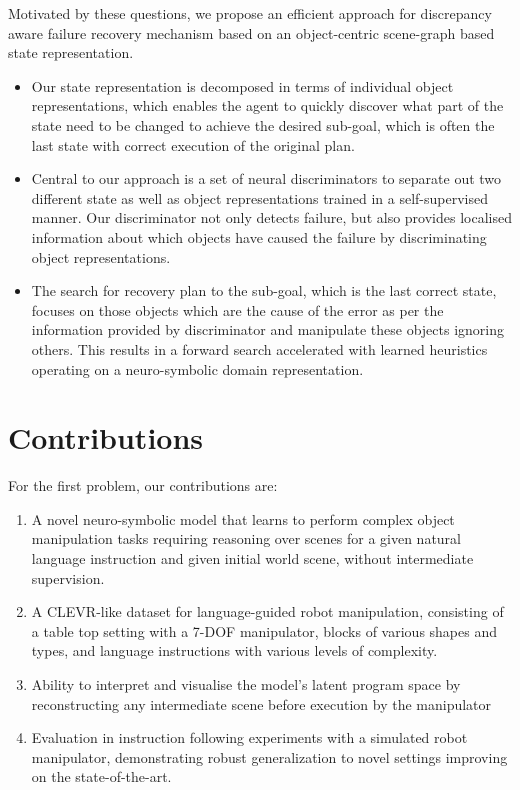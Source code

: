 Motivated by these questions, we propose an efficient approach for discrepancy aware failure recovery mechanism based on an object-centric scene-graph based state representation. 

\begin{itemize}
    \item Our state representation is decomposed in terms of individual object representations, which enables the agent to quickly discover what part of the state need to be changed to achieve the desired sub-goal, which is often the last state with correct execution of the original plan. 
    \item Central to our approach is a set of neural discriminators to separate out two different state as well as object representations trained in a self-supervised manner. Our discriminator not only detects failure, but also provides localised information about which objects have caused the failure by discriminating object representations.
    \item The search for recovery plan to the sub-goal, which is the last correct state, focuses on those objects which are the cause of the error as per the information provided by discriminator and manipulate these objects ignoring others. This results in a forward search accelerated with learned heuristics operating on a neuro-symbolic domain representation.
\end{itemize}


\section{Contributions}

For the first problem, our contributions are: 
%
\begin{enumerate}
\item A novel neuro-symbolic model that learns to perform complex object manipulation tasks requiring reasoning over scenes for a given natural language instruction and given initial world scene, without intermediate supervision.  
%
\item A CLEVR-like dataset for language-guided robot manipulation, consisting of a table top setting with a 7-DOF manipulator, blocks of various shapes and types, and language instructions with various levels of complexity.
%
\item Ability to interpret and visualise the model's latent program space by reconstructing any intermediate scene before execution by the manipulator 
%
\item Evaluation in instruction following experiments with a simulated robot manipulator, demonstrating robust generalization to novel settings improving on the state-of-the-art.
\end{enumerate}

